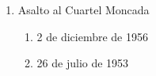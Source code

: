 \documentclass[twocolumn]{article}
\begin{document}
\begin{enumerate}
  \item Asalto al Cuartel Moncada

  \begin{enumerate}
   
   \item 2 de diciembre de 1956
   
   \item 26 de julio de 1953
   
  \end{enumerate}


\end{enumerate}


\end{document}

